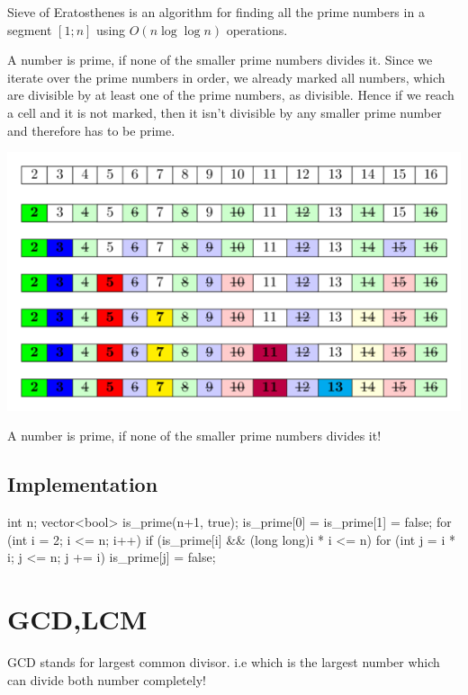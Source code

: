 Sieve of Eratosthenes is an algorithm for finding all the prime numbers in a segment $[1;n]$ using $O(n \log \log n)$ operations.

A number is prime, if none of the smaller prime numbers divides it. Since we iterate over the prime numbers in order, we already marked all numbers, which are divisible by at least one of the prime numbers, as divisible. Hence if we reach a cell and it is not marked, then it isn't divisible by any smaller prime number and therefore has to be prime.

\begin{marginfigure}
    
    \includegraphics[width=\marginparwidth]{../resources/sieve_eratosthenes.png}
    \caption{A number is prime, if none of the smaller prime numbers divides it!}

\end{marginfigure}

\subsection{Implementation}
\begin{code2}
    int n;
    vector<bool> is_prime(n+1, true);
    is_prime[0] = is_prime[1] = false;
    for (int i = 2; i <= n; i++) {
        if (is_prime[i] && (long long)i * i <= n) {
            for (int j = i * i; j <= n; j += i)
                is_prime[j] = false;
        }
    }
\end{code2}

\section{GCD,LCM}

GCD stands for largest common divisor. i.e which is the largest number which can divide both number completely!

